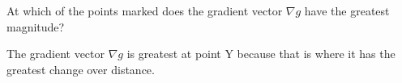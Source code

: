 At which of the points marked does the gradient vector $\nabla g$ have the greatest magnitude?

\begin{solution}
    The gradient vector $\nabla g$ is greatest at point Y because that is where it has the greatest change over distance.
\end{solution}